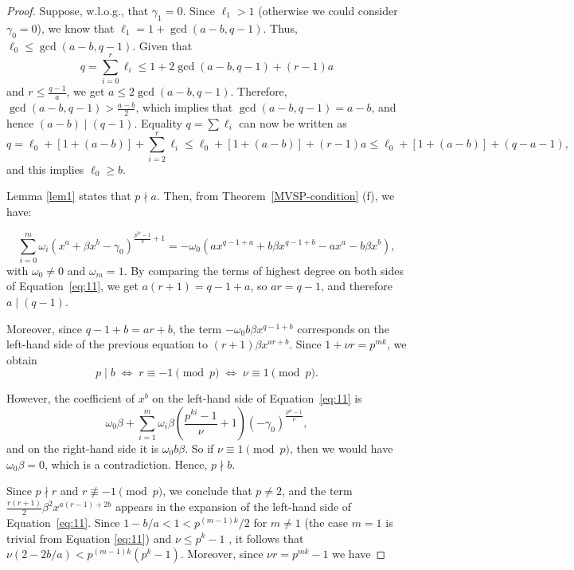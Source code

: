 \documentclass[preprint,12pt]{elsarticle}
\begin{document}
\begin{proof}
    Suppose,  w.l.o.g., that $\gamma_1 = 0$. Since $\ell_1 > 1$ (otherwise we could consider $\gamma_0 = 0$), we know that $\ell_1 = 1 + \gcd(a - b, q - 1)$. Thus, $\ell_0 \leq \gcd(a - b, q - 1)$. Given that 
    $$
    q = \sum_{i = 0}^r \ell_i \leq 1 + 2\gcd(a - b, q - 1) + (r - 1)a
    $$
    and $r \leq \frac{q - 1}{a}$, we get $a \leq 2\gcd(a - b, q - 1)$. Therefore, $\gcd(a - b, q - 1) > \frac{a - b}{2}$, which implies that $\gcd(a - b, q - 1) = a - b$, and hence $(a - b) \mid (q - 1)$. Equality $q = \sum \ell_i$ can now be written as
    $$q = \ell_0 + [1 + (a - b)] + \sum_{i=2}^{r} \ell_i \leq \ell_0 + [1 + (a - b)] + (r - 1)a \leq \ell_0 + [1 + (a - b)] + (q - a -1),$$
    and this implies $\ell_0 \geq b$.

   Lemma \ref{lem1} states that \( p \nmid a \). Then, from Theorem~\ref{MVSP-condition} (f), we have:

    \begin{equation}\label{eq:11}
        \sum_{i = 0}^{m} \omega_i (x^a + \beta x^b - \gamma_0)^{\frac{p^{ki} - 1}{\nu} + 1} 
        = -\omega_0 (a x^{q - 1 + a} + b \beta x^{q - 1 + b} - a x^a - b \beta x^b),
    \end{equation}
    with $\omega_0 \ne 0$ and $\omega_m = 1$. By comparing the terms of highest degree on both sides of Equation~\eqref{eq:11}, we get $a(r + 1) = q - 1 + a$, so $ar = q - 1$, and therefore $a \mid (q - 1)$. 

    Moreover, since $q - 1 + b = ar + b$, the term $-\omega_0 b \beta x^{q - 1 + b}$ corresponds on the left-hand side of the previous equation to $(r + 1)\beta x^{ar + b}$. Since $1 + \nu r = p^{mk}$, we obtain
    $$
        p \mid b \;\Leftrightarrow\; r \equiv -1 \pmod{p} \;\Leftrightarrow\; \nu \equiv 1 \pmod{p}.
    $$

    However, the coefficient of $x^b$ on the left-hand side of Equation~\eqref{eq:11} is
    $$
    \omega_0 \beta + \sum_{i = 1}^{m} \omega_i \beta \left(\frac{p^{ki} - 1}{\nu} + 1\right)(-\gamma_0)^{\frac{p^{ki} - 1}{\nu}},
    $$
    and on the right-hand side it is $\omega_0 b \beta$. So if $\nu \equiv 1 \pmod{p}$, then we would have $\omega_0 \beta = 0$, which is a contradiction. Hence, $p \nmid b$.

    Since $p \nmid r$ and $r \not\equiv -1 \pmod{p}$, we conclude that $p \ne 2$, and the term $\frac{r(r + 1)}{2} \beta^2 x^{a(r - 1) + 2b}$ appears in the expansion of the left-hand side of Equation~\eqref{eq:11}. Since  $1-b/a < 1< p^{(m-1)k}/2$ for $m \neq 1$ (the case $m=1$ is trivial from Equation \eqref{eq:11}) and $\nu \leq p^k-1$ , it follows that $\nu (2 - 2b/a) < p^{(m-1)k} (p^k -1)$. Moreover, since $\nu r=p^{mk}-1$ we have


\end{proof}
\end{document}

